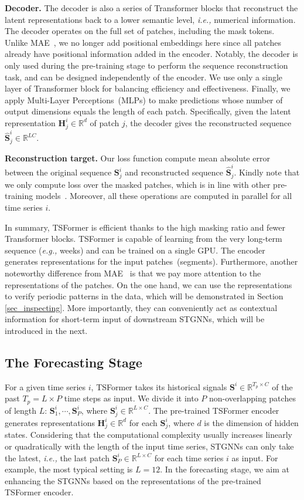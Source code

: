 \documentclass[sigconf]{acmart}
\newcommand{\eg}{\textit{e.g.,}\xspace}
\newcommand{\ie}{\textit{i.e.,}\xspace}
\begin{document}
\noindent \textbf{Decoder.} 
The decoder is also a series of Transformer blocks that reconstruct the latent representations back to a lower semantic level, \ie numerical information. 
The decoder operates on the full set of patches, including the mask tokens.
Unlike MAE~\cite{2021MAE}, we no longer add positional embeddings here since all patches already have positional information added in the encoder. 
Notably, the decoder is only used during the pre-training stage to perform the sequence reconstruction task, and can be designed independently of the encoder.
We use only a single layer of Transformer block for balancing efficiency and effectiveness.
{\color{black}
Finally, we apply Multi-Layer Perceptions~(MLPs) to make predictions whose number of output dimensions equals the length of each patch.
Specifically, given the latent representation $\mathbf{H}^i_j\in\mathbb{R}^d$ of patch $j$, the decoder gives the reconstructed sequence $\hat{\mathbf{S}}^i_j\in\mathbb{R}^{LC}$.}

\noindent \textbf{Reconstruction target.}
Our loss function compute mean absolute error between the original sequence $\mathbf{S}^i_j$ and reconstructed sequence $\hat{\mathbf{S}}^i_j$.
Kindly note that we only compute loss over the masked patches, which is in line with other pre-training models~\cite{2021MAE, 2019BERT}. Moreover, all these operations are computed in parallel for all time series $i$.


In summary, TSFormer is efficient thanks to the high masking ratio and fewer Transformer blocks.
TSFormer is capable of learning from the very long-term sequence (\eg weeks) and can be trained on a single GPU.
The encoder generates representations for the input patches~(segments).
Furthermore, another noteworthy difference from MAE~\cite{2021MAE} is that we pay more attention to the representations of the patches. 
On the one hand, we can use the representations to verify periodic patterns in the data, which will be demonstrated in Section \ref{sec_inspecting}. 
More importantly, they can conveniently act as contextual information for short-term input of downstream STGNNs, which will be introduced in the next.


\subsection{The Forecasting Stage}
For a given time series $i$, TSFormer takes its historical signals $\mathbf{S}^i\in\mathbb{R}^{T_p\times C}$ of the past $T_p=L\times P$ time steps as input.
We divide it into $P$ non-overlapping patches of length $L$: $\mathbf{S}_1^i, \cdots, \mathbf{S}_P^i$, where $\mathbf{S}_j^i\in\mathbb{R}^{L\times C}$.
The pre-trained TSFormer encoder generates representations $\mathbf{H}_j^i\in\mathbb{R}^{d}$ for each $\mathbf{S}_j^i$, where $d$ is the dimension of hidden states.
Considering that the computational complexity usually increases linearly or quadratically with the length of the input time series, STGNNs can only take the latest, \ie the last patch $\mathbf{S}_P^i\in\mathbb{R}^{L\times C}$ for each time series $i$ as input.
For example, the most typical setting is $L=12$.
In the forecasting stage, we aim at enhancing the STGNNs based on the representations of the pre-trained TSFormer encoder.
\end{document}
